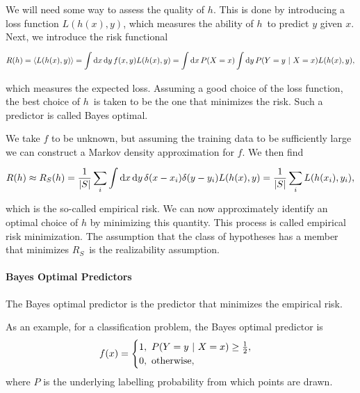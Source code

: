 We will need some way to assess the quality of $h$. This is done by introducing a loss function $L(h(x), y)$, which measures the ability of $h$ to predict $y$ given $x$. Next, we introduce the risk functional
\begin{align*}
	R(h) = \expval{L(h(x), y)} = \int\limits_{}^{}\dd{x}\dd{y}f(x, y)L(h(x), y) = \int\limits_{}^{}\dd{x}P(X = x)\int\limits_{}^{}\dd{y}P(Y = y\ \vert\  X = x)L(h(x), y),
\end{align*}
which measures the expected loss. Assuming a good choice of the loss function, the best choice of $h$ is taken to be the one that minimizes the risk. Such a predictor is called Bayes optimal.

We take $f$ to be unknown, but assuming the training data to be sufficiently large we can construct a Markov density approximation for $f$. We then find
\begin{align*}
	R(h)\approx R_{S}(h) = \frac{1}{\abs{S}}\sum\limits_{i}\int\limits_{}^{}\dd{x}\dd{y}\delta(x - x_{i})\delta(y - y_{i})L(h(x), y) = \frac{1}{\abs{S}}\sum\limits_{i}L(h(x_{i}), y_{i}),
\end{align*}
which is the so-called empirical risk. We can now approximately identify an optimal choice of $h$ by minimizing this quantity. This process is called empirical risk minimization. The assumption that the class of hypotheses has a member that minimizes $R_{S}$ is the realizability assumption.

\paragraph{Bayes Optimal Predictors}
The Bayes optimal predictor is the predictor that minimizes the empirical risk.

As an example, for a classification problem, the Bayes optimal predictor is
\begin{align*}
	f(x) = 
	\begin{cases}
		1,\ P(Y = y\ \vert\  X = x) \geq \frac{1}{2}, \\
		0,\ \text{otherwise},
	\end{cases}
\end{align*}
where $P$ is the underlying labelling probability from which points are drawn.

